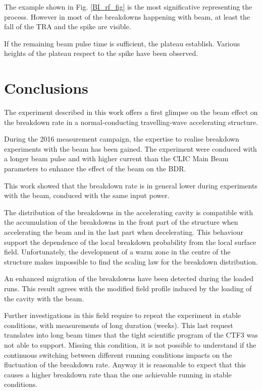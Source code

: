 The example shown in Fig. \ref{BI_rf_fig} is the most significative representing the process. However in most of the breakdowns happening with beam, at least the fall of the TRA and the spike are visible. 

If the remaining beam pulse time is sufficient, the plateau establish. Various heights of the plateau respect to the spike have been observed. 


\section{Conclusions}

The experiment described in this work offers a first glimpse on the beam effect on the breakdown rate in a normal-conducting travelling-wave accelerating structure.

During the 2016 measurement campaign, the expertise to realise breakdown experiments with the beam has been gained. The experiment were conduced with a longer beam pulse and with higher current than the CLIC Main Beam parameters to enhance the effect of the beam on the BDR.

This work showed that the breakdown rate is in general lower during experiments with the beam, conduced with the same input power. 

The distribution of the breakdowns in the accelerating cavity is compatible with the accumulation of the breakdowns in the front part of the structure when accelerating the beam and in the last part when decelerating. This behaviour support the dependence of the local breakdown probability from the local surface field. Unfortunately, the development of a warm zone in the centre of the structure makes impossible to find the scaling law for the breakdown distribution. 

An enhanced migration of the breakdowns have been detected during the loaded runs. This result agrees with the modified field profile induced by the loading of the cavity with the beam.

Further investigations in this field require to repeat the experiment in stable conditions, with measurements of long duration (weeks). This last request translates into long beam times that the tight scientific program of the CTF3 was not able to support. Missing this condition, it is not possible to understand if the continuous switching between different running conditions impacts on the fluctuation of the breakdown rate. Anyway it is reasonable to expect that this causes a higher breakdown rate than the one achievable running in stable conditions. 

